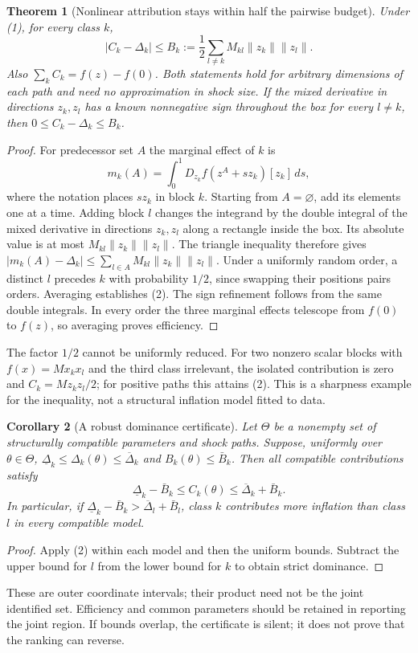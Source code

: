 \documentclass[11pt]{article}
\newtheorem{theorem}{Theorem}
\newtheorem{corollary}[theorem]{Corollary}
\theoremstyle{remark}
\begin{document}
\begin{theorem}[Nonlinear attribution stays within half the pairwise budget]
Under (1), for every class $k$,
\[
 |C_k-\Delta_k|
 \leq B_k:=\frac12\sum_{l\ne k}M_{kl}\|z_k\|\|z_l\|.              \tag{2}
\]
Also $\sum_kC_k=f(z)-f(0)$. Both statements hold for arbitrary dimensions
of each path and need no approximation in shock size.
If the mixed derivative in directions $z_k,z_l$ has a known nonnegative
sign throughout the box for every $l\ne k$, then
$0\leq C_k-\Delta_k\leq B_k$.
\end{theorem}
\begin{proof}
For predecessor set $A$ the marginal effect of $k$ is
\[
 m_k(A)=\int_0^1D_{z_k}f(z^A+sz_k)[z_k]\,ds,
\]
where the notation places $sz_k$ in block $k$. Starting from $A=\varnothing$,
add its elements one at a time. Adding block $l$ changes the integrand
by the double integral of the mixed derivative in directions $z_k,z_l$
along a rectangle inside the box. Its absolute value is at most
$M_{kl}\|z_k\|\|z_l\|$. The triangle inequality therefore gives
$|m_k(A)-\Delta_k|\leq\sum_{l\in A}M_{kl}\|z_k\|\|z_l\|$.
Under a uniformly random order, a distinct $l$ precedes $k$ with
probability $1/2$, since swapping their positions pairs orders. Averaging
establishes (2). The sign refinement follows from the same double
integrals. In every order the three marginal effects telescope from
$f(0)$ to $f(z)$, so averaging proves efficiency.
\end{proof}
The factor $1/2$ cannot be uniformly reduced. For two nonzero scalar
blocks with $f(x)=M x_kx_l$ and the third class irrelevant, the isolated
contribution is zero and $C_k=M z_kz_l/2$; for positive paths this attains
(2). This is a sharpness example for the inequality, not a structural
inflation model fitted to data.

\begin{corollary}[A robust dominance certificate]
Let $\Theta$ be a nonempty set of structurally compatible parameters and
shock paths. Suppose, uniformly over $\theta\in\Theta$,
$\underline\Delta_k\leq\Delta_k(\theta)\leq\overline\Delta_k$ and
$B_k(\theta)\leq\bar B_k$. Then all compatible contributions satisfy
\[
 \underline\Delta_k-\bar B_k\leq C_k(\theta)
       \leq\overline\Delta_k+\bar B_k.                            \tag{3}
\]
In particular, if
$\underline\Delta_k-\bar B_k>
\overline\Delta_l+\bar B_l$, class $k$ contributes more inflation than
class $l$ in every compatible model.
\end{corollary}
\begin{proof}
Apply (2) within each model and then the uniform bounds. Subtract the
upper bound for $l$ from the lower bound for $k$ to obtain strict dominance.
\end{proof}
These are outer coordinate intervals; their product need not be the joint
identified set. Efficiency and common parameters should be retained in
reporting the joint region. If bounds overlap, the certificate is silent;
it does not prove that the ranking can reverse.
\end{document}
